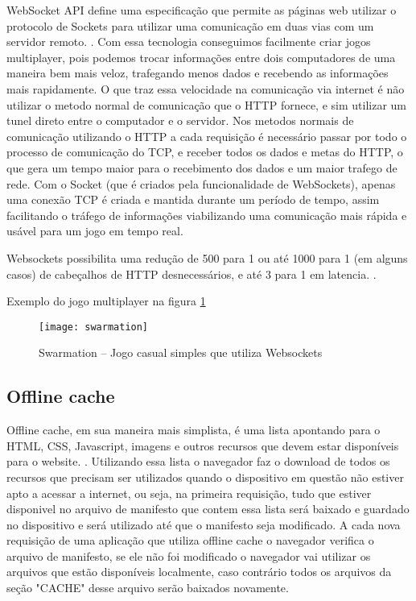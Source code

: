 WebSocket API define uma especificação que permite as páginas web
utilizar o protocolo de Sockets para utilizar uma comunicação em duas
vias com um servidor remoto. \cite{w3cwebsockets}. Com essa tecnologia
conseguimos facilmente criar jogos multiplayer, pois podemos
trocar informações entre dois computadores de uma maneira bem mais
veloz, trafegando menos dados e recebendo as informações mais
rapidamente.
O que traz essa velocidade na comunicação via internet é não utilizar
o metodo normal de comunicação que o HTTP fornece, e sim utilizar um
tunel direto entre o computador e o servidor.
Nos metodos normais de comunicação utilizando o HTTP a cada requisição
é necessário passar por todo o processo de comunicação do TCP, e
receber todos os dados e metas do HTTP, o que gera um tempo maior para
o recebimento dos dados e um maior trafego de rede. Com o Socket (que
é criados pela funcionalidade de WebSockets), apenas uma conexão TCP é
criada e mantida durante um período de tempo, assim facilitando o
tráfego de informações viabilizando uma comunicação mais rápida e
usável para um jogo em tempo real.

Websockets possibilita uma redução de 500 para 1 ou até 1000 para 1
(em alguns casos) de cabeçalhos de HTTP desnecessários, e até 3 para 1
em latencia. \cite{lubbers2010pro}.

Exemplo do jogo multiplayer na figura \ref{img:swarmation}

\newlength{\imgwidth}
\setlength{\imgwidth}{16.09cm}
\newlength{\imgheight}
\setlength{\imgheight}{10.59cm}

\begin{figure}[H]
  \centering
	\texttt{[image: swarmation]}
  \caption{Swarmation {--} Jogo casual simples que utiliza Websockets}
  \label{img:swarmation}
\end{figure}

\clearpage



\subsection{Offline cache}
Offline cache, em sua maneira mais simplista, é uma lista apontando
para o HTML, CSS, Javascript, imagens e outros recursos que devem
estar disponíveis para o website. \cite{pilgrim2010html5}. Utilizando
essa lista o navegador faz o download de todos os recursos que
precisam ser utilizados quando o dispositivo em questão não estiver
apto a acessar a internet, ou seja, na primeira requisição, tudo que estiver
disponivel no arquivo de manifesto que contem essa lista será baixado
e guardado no dispositivo e será utilizado até que o manifesto seja
modificado.
A cada nova requisição de uma aplicação que utiliza offline cache o
navegador verifica o arquivo de manifesto, se ele não foi modificado
o navegador vai utilizar os arquivos que estão disponíveis localmente,
caso contrário todos os arquivos da seção "CACHE" desse arquivo serão baixados novamente.

